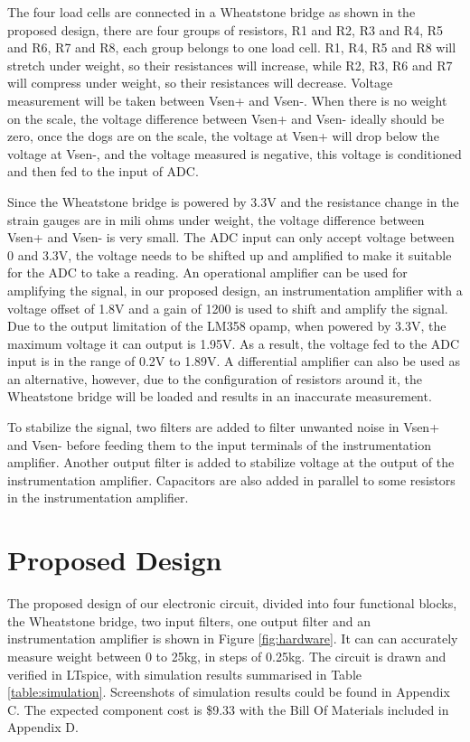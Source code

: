 The four load cells are connected in a Wheatstone bridge as shown in the proposed design, there are four groups of resistors, R1 and R2, R3 and R4, R5 and R6, R7 and R8, each group belongs to one load cell. R1, R4, R5 and R8 will stretch under weight, so their resistances will increase, while R2, R3, R6 and R7 will compress under weight, so their resistances will decrease. Voltage measurement will be taken between Vsen+ and Vsen-. When there is no weight on the scale, the voltage difference between Vsen+ and Vsen- ideally should be zero, once the dogs are on the scale, the voltage at Vsen+ will drop below the voltage at Vsen-, and the voltage measured is negative, this voltage is conditioned and then fed to the input of ADC.

Since the Wheatstone bridge is powered by 3.3V and the resistance change in the strain gauges are in mili ohms under weight, the voltage difference between Vsen+ and Vsen- is very small. The ADC input can only accept voltage between 0 and 3.3V, the voltage needs to be shifted up and amplified to make it suitable for the ADC to take a reading. An operational amplifier can be used for amplifying the signal, in our proposed design, an instrumentation amplifier with a voltage offset of 1.8V and a gain of 1200 is used to shift and amplify the signal. Due to the output limitation of the LM358 opamp, when powered by 3.3V, the maximum voltage it can output is 1.95V. As a result, the voltage fed to the ADC input is in the range of 0.2V to 1.89V. A differential amplifier can also be used as an alternative, however, due to the configuration of resistors around it, the Wheatstone bridge will be loaded and results in an inaccurate measurement.

To stabilize the signal, two filters are added to filter unwanted noise in Vsen+ and Vsen- before feeding them to the input terminals of the instrumentation amplifier. Another output filter is added to stabilize voltage at the output of the instrumentation amplifier. Capacitors are also added in parallel to some resistors in the instrumentation amplifier.

\section{Proposed Design}
The proposed design of our electronic circuit, divided into four functional blocks, the Wheatstone bridge, two input filters, one output filter and an instrumentation amplifier is shown in Figure \ref{fig:hardware}. It can can accurately measure weight between 0 to 25kg, in steps of 0.25kg. The circuit is drawn and verified in LTspice, with simulation results summarised in Table \ref{table:simulation}. Screenshots of simulation results could be found in Appendix C. The expected component cost is \$9.33 with the Bill Of Materials included in Appendix D.

